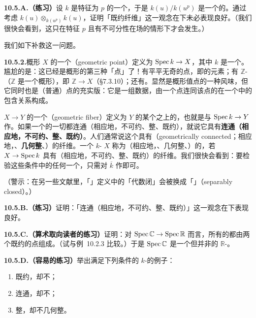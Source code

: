 \textbf{10.5.A.（练习）}\quad 设 $k$ 是特征为 $p$ 的一个\trField，于是 $k(u)/k(u^p)$ 是一个\trPurelyInseparable{}的\trFieldExtension。通过考虑 $k(u)\otimes_{k(u^p)}k(u)$，证明「既约纤维」这一观念在\trPullback{}下未必表现良好。（我们很快会看到，这只在特征 $p$ 且有不可分性在场的情形下才会发生。）

我们如下补救这一问题。

\textbf{10.5.2.}\quad 概形 $X$ 的一个\textbf{\trGeometricPoint{}}（geometric point）定义为\trMorphism{} $\operatorname{Spec} k\to X$，其中 $k$ 是一个\trAlgClosedField。尴尬的是：这已经是概形的第三种「点」了！有平平无奇的点，即\trUnderlyingSet{}的元素；有 $\mathbb{Z}$-\trValuedPoint（$\mathbb{Z}$ 是一个概形），即\trMap{} $\mathbb{Z}\to X$（\S7.3.10）；还有\trGeometricPoint{}。\trGeometricPoint{}显然是概形值点的一种风味，但它同时也是（普通）点的充实版：它是一组数据，由一个点连同该点的\trResidueField{}在一个\trAlgClosedField{}中的包含关系构成。

\trMorphism{} $X\to Y$ 的一个\textbf{\trGeometricFiber{}}（geometric fiber）定义为 $Y$ 的某个\trGeometricPoint{}之上的\trFiber，也就是与\trGeometricPoint{} $\operatorname{Spec} k\to Y$ 作\trFiberProduct。如果一个\trMorphism{}的一切\trGeometricFiber{}都连通（相应地，不可约、整、既约），就说它具有\textbf{连通（相应地，不可约、整、既约）\trGeometricFiber{}}。人们通常说这个\trMorphism{}具有\textbf{\trGeometricallyConnected{}}（geometrically connected；相应地，\textbf{\trGeometricallyIrreducible{}}、\textbf{几何整}、\textbf{\trGeometricallyReduced{}}）的纤维。一个 $k$-\trScheme{} $X$ 称为\trGeometricallyConnected{}（相应地，\trGeometricallyIrreducible{}、几何整、\trGeometricallyReduced{}）的，若\trStructureMorphism{} $X\to\operatorname{Spec} k$ 具有\trGeometricallyConnected{}（相应地，不可约、整、既约）的纤维。我们很快会看到：要检验这些条件中的任何一个，只需对 $\overline{k}$ 作\trBaseChange{}即可。

（警示：在另一些文献里，「\trGeometricPoint{}」定义中的「代数闭」会被换成「\trSeparablyClosed{}」（separably closed）。）

\textbf{10.5.B.（练习）}\quad 证明：「连通（相应地，不可约、整、既约）\trGeometricFiber{}」这一观念在\trBaseChange{}下表现良好。

\textbf{10.5.C.（算术取向读者的练习）}\quad 证明：对\trMorphism{} $\operatorname{Spec}\mathbb{C}\to\operatorname{Spec}\mathbb{R}$ 而言，所有的\trGeometricFiber{}都由两个既约的点组成。（试与例~10.2.3 比较。）于是 $\operatorname{Spec}\mathbb{C}$ 是一个\trGeometricallyReduced{}但并非\trGeometricallyIrreducible{}的 $\mathbb{R}$-\trScheme。

\textbf{10.5.D.（容易的练习）}\quad 举出满足下列条件的 $k$-\trScheme{}的例子：
\begin{enumerate}[label=(\alph*)]
  \item 既约，却不\trGeometricallyReduced{}；
  \item 连通，却不\trGeometricallyConnected{}；
  \item 整，却不几何整。
\end{enumerate}

